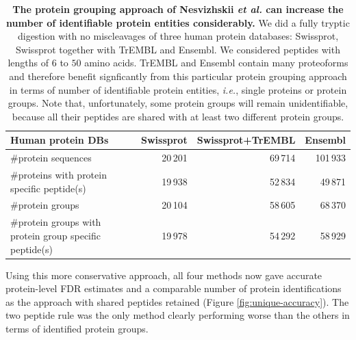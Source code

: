 \documentclass{article}
\begin{document}
\begin{table}[!htp]
  \begin{center}
  
\begin{tabular}{|l|r|r|r|}
\hline
Human protein DBs & Swissprot & Swissprot+TrEMBL & Ensembl\\
\hline
\#protein sequences & 20\,201 & 69\,714 & 101\,933\\
\hline
\#proteins with protein specific peptide(s) & 19\,938 & 52\,834 &
49\,871\\
\hline
\#protein groups & 20\,104 & 58\,605 & 68\,370\\
\hline
\#protein groups with protein group specific peptide(s) & 19\,978 &
54\,292 & 58\,929\\
\hline
\end{tabular}

  \end{center}
  \caption{\label{tab:duplicate-proteins}\textbf{The protein grouping
approach of Nesvizhskii {\em et al.} can increase the number of
identifiable protein entities considerably.} We did a fully tryptic
digestion with no miscleavages of three human protein databases:
Swissprot, Swissprot together with TrEMBL and Ensembl. We considered
peptides with lengths of $6$ to $50$ amino acids. TrEMBL and Ensembl
contain many proteoforms and therefore benefit signficantly from this
particular protein grouping approach in terms of number of
identifiable protein entities, {\em i.e.}, single proteins or protein
groups. Note that, unfortunately, some protein groups will remain
unidentifiable, because all their peptides are shared with at least
two different protein groups.}
\end{table}

Using this more conservative approach, all four methods now gave
accurate protein-level FDR estimates and a comparable number of
protein identifications as the approach with shared peptides retained
(Figure \ref{fig:unique-accuracy}). The two peptide rule was the only
method clearly performing worse than the others in terms of
identified protein groups.
\end{document}
